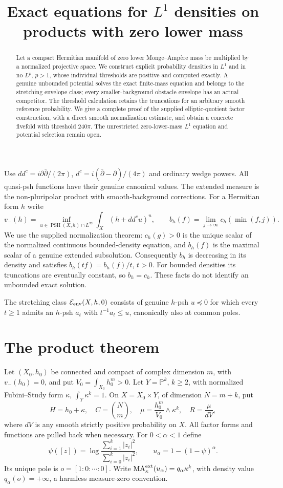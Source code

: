 \documentclass[11pt]{article}
\title{Exact equations for $L^1$ densities on products with zero lower mass}
\author{}\date{}
\newcommand{\ddc}{dd^c}
\newcommand{\dc}{d^c}
\newcommand{\MA}{\operatorname{MA}}
\newcommand{\PSH}{\operatorname{PSH}}
\theoremstyle{remark}\newtheorem{remark}[theorem]{Remark}
\begin{document}
\maketitle
\begin{abstract}
Let a compact Hermitian manifold of zero lower Monge--Amp\`ere mass be
multiplied by a normalized projective space. We construct explicit
probability densities in $L^1$ and in no $L^p$, $p>1$, whose individual
thresholds are positive and computed exactly. A genuine unbounded
potential solves the exact finite-mass equation and belongs to the
stretching envelope class; every smaller-background obstacle envelope
has an actual competitor. The threshold calculation retains the
truncations for an arbitrary smooth reference probability. We give a
complete proof of the supplied elliptic-quotient factor construction,
with a direct smooth normalization estimate, and obtain a concrete
fivefold with threshold $240\pi$. The unrestricted zero-lower-mass
$L^1$ equation and potential selection remain open.
\end{abstract}

Use $\ddc=i\partial\bar\partial/(2\pi)$, $\dc=i(\bar\partial-\partial)/(4\pi)$
and ordinary wedge powers. All quasi-psh functions have their genuine
canonical values. The extended measure is the non-pluripolar product
with smooth-background corrections. For a Hermitian form $h$ write
\[
 v_-(h)=\inf_{u\in\PSH(X,h)\cap L^\infty}\int_X(h+\ddc u)^n,
 \qquad b_h(f)=\lim_{j\to\infty}c_h(\min(f,j)).
\]
We use the supplied normalization theorem: $c_h(g)>0$ is the unique
scalar of the normalized continuous bounded-density equation, and
$b_h(f)$ is the maximal scalar of a genuine extended subsolution.
Consequently $b_h$ is decreasing in its density and satisfies
$b_h(tf)=b_h(f)/t$, $t>0$. For bounded densities its truncations are
eventually constant, so $b_h=c_h$. These facts do not identify an
unbounded exact solution.

The stretching class $\mathcal E_{\rm env}(X,h,0)$ consists of genuine
$h$-psh $u\preceq0$ for which every $t\geq1$ admits an $h$-psh $a_t$
with $t^{-1}a_t\leq u$, canonically also at common poles.

\section{The product theorem}
Let $(X_0,h_0)$ be connected and compact of complex dimension $m$,
with $v_-(h_0)=0$, and put $V_0=\int_{X_0}h_0^m>0$.
Let $Y=\mathbb P^k$, $k\geq2$, with normalized Fubini--Study form
$\kappa$, $\int_Y\kappa^k=1$. On $X=X_0\times Y$, of dimension
$N=m+k$, put
\[
 H=h_0+\kappa,\quad C=\binom Nm,\quad
 \mu=\frac{h_0^m}{V_0}\wedge\kappa^k,\quad R=\frac\mu{dV},
\]
where $dV$ is any smooth strictly positive probability on $X$.
All factor forms and functions are pulled back when necessary.
For $0<\alpha<1$ define
\[
 \psi([z])=\log\frac{\sum_{i=1}^k|z_i|^2}{\sum_{i=0}^k|z_i|^2},
 \qquad u_\alpha=1-(1-\psi)^\alpha.
\]
Its unique pole is $o=[1:0:\cdots:0]$. Write
$\MA_\kappa^{\rm ext}(u_\alpha)=q_\alpha\kappa^k$, with density
value $q_\alpha(o)=+\infty$, a harmless measure-zero convention.
\end{document}
